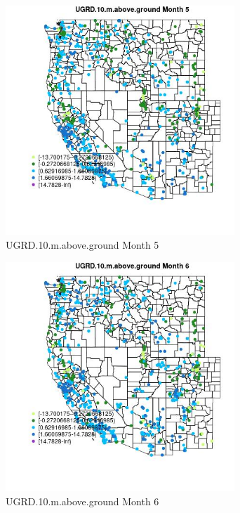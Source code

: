 \begin{figure} 
\centering  
\includegraphics[width=0.77\textwidth]{Code_Outputs/Report_ML_input_PM25_Step4_part_e_de_duplicated_aves_compiled_2019-05-21wNAs_MapObsMo5UGRD10maboveground.jpg} 
\caption{\label{fig:Report_ML_input_PM25_Step4_part_e_de_duplicated_aves_compiled_2019-05-21wNAsMapObsMo5UGRD10maboveground}UGRD.10.m.above.ground Month 5} 
\end{figure} 
 

\begin{figure} 
\centering  
\includegraphics[width=0.77\textwidth]{Code_Outputs/Report_ML_input_PM25_Step4_part_e_de_duplicated_aves_compiled_2019-05-21wNAs_MapObsMo6UGRD10maboveground.jpg} 
\caption{\label{fig:Report_ML_input_PM25_Step4_part_e_de_duplicated_aves_compiled_2019-05-21wNAsMapObsMo6UGRD10maboveground}UGRD.10.m.above.ground Month 6} 
\end{figure} 
 

